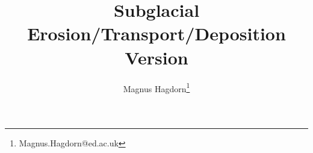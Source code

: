 \newcommand{\dir}{erosion}

\pagestyle{myheadings}


\title{Subglacial Erosion/Transport/Deposition\\Version {\erosionver}}
\author{Magnus Hagdorn\thanks{Magnus.Hagdorn@ed.ac.uk}}
\maketitle
\tableofcontents
\newpage



